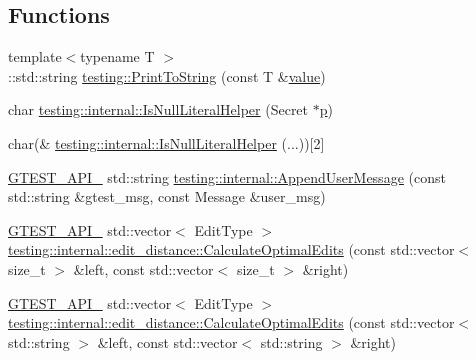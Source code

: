 \subsection*{Functions}
\begin{DoxyCompactItemize}
\item 
{\footnotesize template$<$typename T $>$ }\\\+::std\+::string \mbox{\hyperlink{namespacetesting_aa5717bb1144edd1d262d310ba70c82ed}{testing\+::\+Print\+To\+String}} (const T \&\mbox{\hyperlink{_obj__test_2lib_2googletest-master_2googlemock_2test_2gmock-matchers__test_8cc_a337b8a670efc0b086ad3af163f3121b6}{value}})
\item 
char \mbox{\hyperlink{namespacetesting_1_1internal_afb0731ba39ffef1fa1730ac0699c9025}{testing\+::internal\+::\+Is\+Null\+Literal\+Helper}} (Secret $\ast$\mbox{\hyperlink{_obj__test_2lib_2googletest-master_2googlemock_2test_2gmock-matchers__test_8cc_a6bc6b007533335efe02bafff799ec64c}{p}})
\item 
char(\& \mbox{\hyperlink{namespacetesting_1_1internal_ab53ecfa1632a871ce7c692d722a75a57}{testing\+::internal\+::\+Is\+Null\+Literal\+Helper}} (...))\mbox{[}2\mbox{]}
\item 
\mbox{\hyperlink{_obj__test_2lib_2googletest-release-1_88_81_2googletest_2include_2gtest_2internal_2gtest-port_8h_aa73be6f0ba4a7456180a94904ce17790}{G\+T\+E\+S\+T\+\_\+\+A\+P\+I\+\_\+}} std\+::string \mbox{\hyperlink{namespacetesting_1_1internal_ae475a090bca903bb222dd389eb189166}{testing\+::internal\+::\+Append\+User\+Message}} (const std\+::string \&gtest\+\_\+msg, const Message \&user\+\_\+msg)
\item 
\mbox{\hyperlink{_obj__test_2lib_2googletest-release-1_88_81_2googletest_2include_2gtest_2internal_2gtest-port_8h_aa73be6f0ba4a7456180a94904ce17790}{G\+T\+E\+S\+T\+\_\+\+A\+P\+I\+\_\+}} std\+::vector$<$ Edit\+Type $>$ \mbox{\hyperlink{namespacetesting_1_1internal_1_1edit__distance_a26323b4c2a29ea8e187aafbd4d2275db}{testing\+::internal\+::edit\+\_\+distance\+::\+Calculate\+Optimal\+Edits}} (const std\+::vector$<$ size\+\_\+t $>$ \&left, const std\+::vector$<$ size\+\_\+t $>$ \&right)
\item 
\mbox{\hyperlink{_obj__test_2lib_2googletest-release-1_88_81_2googletest_2include_2gtest_2internal_2gtest-port_8h_aa73be6f0ba4a7456180a94904ce17790}{G\+T\+E\+S\+T\+\_\+\+A\+P\+I\+\_\+}} std\+::vector$<$ Edit\+Type $>$ \mbox{\hyperlink{namespacetesting_1_1internal_1_1edit__distance_a32267b2ae24de1de175ac8217406877d}{testing\+::internal\+::edit\+\_\+distance\+::\+Calculate\+Optimal\+Edits}} (const std\+::vector$<$ std\+::string $>$ \&left, const std\+::vector$<$ std\+::string $>$ \&right)

\end{DoxyCompactItemize}
